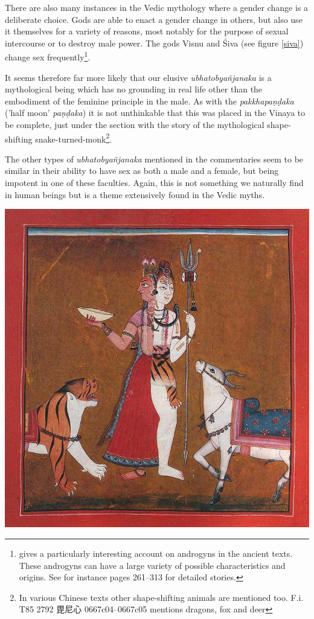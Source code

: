 There are also many instances in the Vedic mythology where a gender change is a deliberate choice. Gods are able to enact a gender change in others, but also use it themselves for a variety of reasons, most notably for the purpose of sexual intercourse or to destroy male power. The gods Visnu and Śiva (see figure \ref{siva}) change sex frequently\footnote{\cite{wendy} gives a particularly interesting account on androgyns in the ancient texts. These androgyns can have a large variety of possible characteristics and origins. See for instance pages 261–313 for detailed stories.}.

It seems therefore far more likely that our elusive {\em ubhatob­yañ­janaka} is a mythological being which has no grounding in real life other than the embodiment of the feminine principle in the male. As with the {\em pakkhapaṇḍaka} ('half moon' {\em paṇḍaka}) it is not unthinkable that this was placed in the Vinaya to be complete, just under the section with the story of the mythological shape-shifting snake-turned-monk\footnote{In various Chinese texts other shape-shifting animals are mentioned too. F.i. T85 2792 毘尼心 0667c04–0667c05 mentions dragons, fox and deer}.

The other types of {\em ubhatob­yañ­janaka} mentioned in the commentaries seem to be similar in their ability to have sex as both a male and a female, but being impotent in one of these faculties. Again, this is not something we naturally find in human beings but is a theme extensively found in the Vedic myths.

\bigskip
\includegraphics[width=\textwidth]{androgyne.jpg}
\label{siva}

